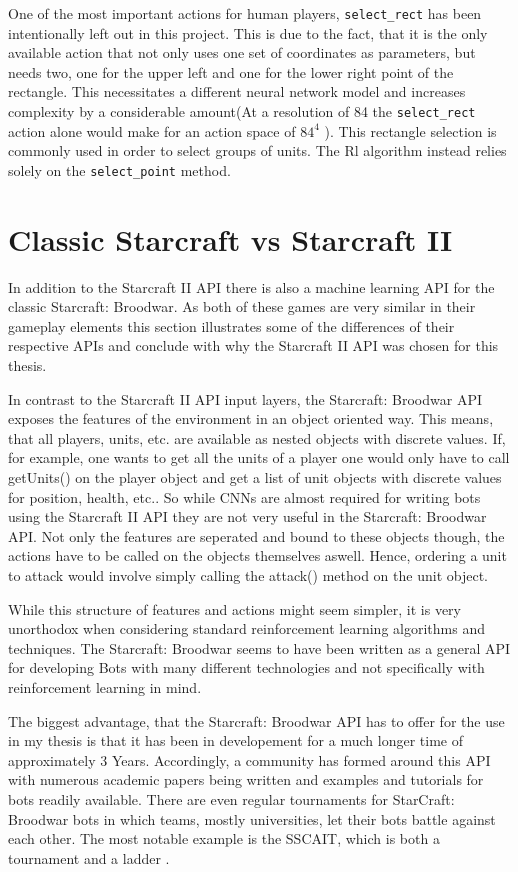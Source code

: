 One of the most important actions for human players, \lstinline{select_rect} has been intentionally left out in this project. This is due to the fact, that it is the only available action that not only uses one set of coordinates as parameters, but needs two, one for the upper left and one for the lower right point of the rectangle. This necessitates a different neural network model and increases complexity by a considerable amount(At a resolution of 84 the \lstinline{select_rect} action alone would make for an action space of $84^4$ ). This rectangle selection is commonly used in order to select groups of units. The Rl algorithm instead relies solely on the \lstinline{select_point} method.



\section{Classic Starcraft vs Starcraft II}
In addition to the Starcraft II API there is also a machine learning API for the classic Starcraft: Broodwar.
As both of these games are very similar in their gameplay elements this section illustrates some of the differences of their respective APIs and conclude with why the Starcraft II API was chosen for this thesis.

In contrast to the Starcraft II API input layers, the Starcraft: Broodwar API exposes the features of the environment in an object oriented way. This means, that all players, units, etc. are available as nested objects with discrete values. If, for example, one wants to get all the units of a player one would only have to call getUnits() on the player object and get a list of unit objects with discrete values for position, health, etc.. So while CNNs are almost required for writing bots using the Starcraft II API they are not very useful in the Starcraft: Broodwar API. Not only the features are seperated and bound to these objects though, the actions have to be called on the objects themselves aswell. Hence, ordering a unit to attack would involve simply calling the attack() method on the unit object. 

While this structure of features and actions might seem simpler, it is very unorthodox when considering standard reinforcement learning algorithms and techniques. The Starcraft: Broodwar seems to have been written as a general API for developing Bots with many different technologies and not specifically with reinforcement learning in mind. 

The biggest advantage, that the Starcraft: Broodwar API has to offer for the use in my thesis is that it has been in developement for a much longer time of approximately 3 Years. Accordingly, a community has formed around this API with numerous academic papers being written and examples and tutorials for bots readily available. There are even regular tournaments for StarCraft: Broodwar bots in which teams, mostly universities, let their bots battle against each other. The most notable example is the SSCAIT, which is both a tournament and a ladder \citep{sscait}.

